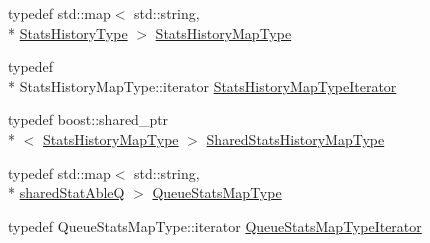 \begin{DoxyCompactItemize}
typedef std\-::map$<$ std\-::string, \\*
\hyperlink{namespacekisscpp_a4629097b5a6697a8a1eefd9ac5b0a2b6}{Stats\-History\-Type} $>$ \hyperlink{namespacekisscpp_a8dbb864ea5d1e1fae0d3a1435bd295e7}{Stats\-History\-Map\-Type}
\item 
typedef \\*
Stats\-History\-Map\-Type\-::iterator \hyperlink{namespacekisscpp_ae45d7146f3abe3c95364c6ea280f7487}{Stats\-History\-Map\-Type\-Iterator}
\item 
typedef boost\-::shared\-\_\-ptr\\*
$<$ \hyperlink{namespacekisscpp_a8dbb864ea5d1e1fae0d3a1435bd295e7}{Stats\-History\-Map\-Type} $>$ \hyperlink{namespacekisscpp_afa626c76d3dca5d5e1be4146f211fefa}{Shared\-Stats\-History\-Map\-Type}
\item 
typedef std\-::map$<$ std\-::string, \\*
\hyperlink{namespacekisscpp_a141592ccd82280d2692ca3b9b490faab}{shared\-Stat\-Able\-Q} $>$ \hyperlink{namespacekisscpp_a36c7aee4be6fad3cc8ab5ec896e1f9a5}{Queue\-Stats\-Map\-Type}
\item 
typedef Queue\-Stats\-Map\-Type\-::iterator \hyperlink{namespacekisscpp_a108455a00c9a8ea1f3416c5cab767bbe}{Queue\-Stats\-Map\-Type\-Iterator}
\end{DoxyCompactItemize}
